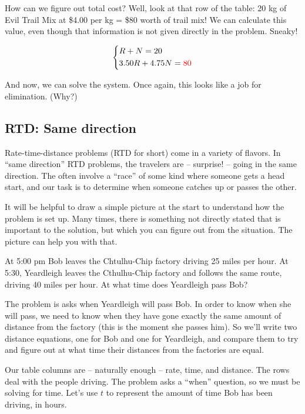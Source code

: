 How can we figure out total cost? Well, look at that row of the table: 20 kg of Evil Trail Mix at \$4.00 per kg = \$80 worth of trail mix! We can calculate this value, even though that information is not given directly in the problem. Sneaky!

\[
\left\{%
\begin{aligned}
&R+N=20\\
&3.50R + 4.75N = {\color{red} 80}
\end{aligned}
\right.
\]

And now, we can solve the system. Once again, this looks like a job for elimination. (Why?)

\subsection*{RTD: Same direction}

Rate-time-distance problems (RTD for short) come in a variety of flavors. In ``same direction'' RTD problems, the travelers are -- surprise! -- going in the same direction. The often involve a ``race'' of some kind where someone gets a head start, and our task is to determine when someone catches up or passes the other.

It will be helpful to draw a simple picture at the start to understand how the problem is set up. Many times, there is something not directly stated that is important to the solution, but which you can figure out from the situation. The picture can help you with that.

\begin{boxedex}
At 5:00 pm Bob leaves the Chtulhu-Chip factory driving 25 miles per hour. At 5:30, Yeardleigh leaves the Cthulhu-Chip factory and follows the same route, driving 40 miles per hour. At what time does Yeardleigh pass Bob?
\end{boxedex}

The problem is asks when Yeardleigh will pass Bob. In order to know when she will pass, we need to know when they have gone exactly the same amount of distance from the factory (this is the moment she passes him). So we'll write two distance equations, one for Bob and one for Yeardleigh, and compare them to try and figure out at what time their distances from the factories are equal.


Our table columns are -- naturally enough -- rate, time, and distance. The rows deal with the people driving. The problem asks a ``when'' question, so we must be solving for time. Let's use $t$ to represent the amount of time Bob has been driving, in hours.


